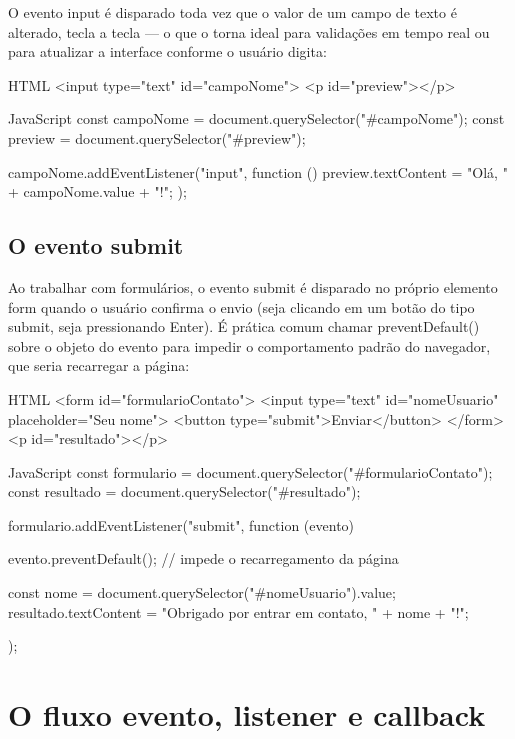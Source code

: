 O evento input é disparado toda vez que o valor de um campo de texto é alterado, tecla a tecla — o que o torna ideal para validações em tempo real ou para atualizar a interface conforme o usuário digita:

\begin{codebox}{HTML}
 <input type="text" id="campoNome">
 <p id="preview"></p>
\end{codebox}

\begin{codebox}{JavaScript}
const campoNome = document.querySelector("#campoNome");
const preview = document.querySelector("#preview");

campoNome.addEventListener("input", function () {
  preview.textContent = "Olá, " + campoNome.value + "!";
});
\end{codebox}

\subsection{O evento submit}

Ao trabalhar com formulários, o evento submit é disparado no próprio elemento form quando o usuário confirma o envio (seja clicando em um botão do tipo submit, seja pressionando Enter). É prática comum chamar preventDefault() sobre o objeto do evento para impedir o comportamento padrão do navegador, que seria recarregar a página:

\begin{codebox}{HTML}
<form id="formularioContato">
  <input type="text" id="nomeUsuario" placeholder="Seu nome">
  <button type="submit">Enviar</button>
</form>
<p id="resultado"></p>
\end{codebox}

\begin{codebox}{JavaScript}
const formulario = document.querySelector("#formularioContato");
const resultado = document.querySelector("#resultado");

formulario.addEventListener("submit", function (evento) {
  evento.preventDefault(); // impede o recarregamento da página

  const nome = document.querySelector("#nomeUsuario").value;
  resultado.textContent = "Obrigado por entrar em contato, " + nome + "!";
});
\end{codebox}

\section{O fluxo evento, listener e callback}


